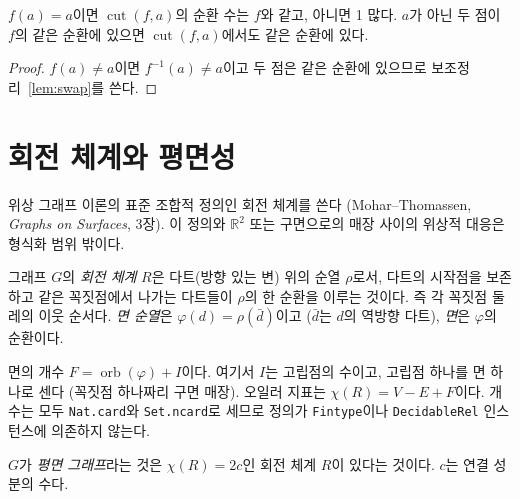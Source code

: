 \begin{lemma}[잘라 내기의 순환 수]
\label{lem:orbitCount_cut}
\leanok
{}
\(f(a) = a\)이면 \(\operatorname{cut}(f, a)\)의 순환 수는 \(f\)와 같고, 아니면 1 많다.
\(a\)가 아닌 두 점이 \(f\)의 같은 순환에 있으면 \(\operatorname{cut}(f, a)\)에서도 같은 순환에 있다.
\end{lemma}

\begin{proof}
\leanok
{}
\(f(a) \ne a\)이면 \(f^{-1}(a) \ne a\)이고 두 점은 같은 순환에 있으므로 보조정리~\ref{lem:swap}를 쓴다.
\end{proof}

\section{회전 체계와 평면성}

위상 그래프 이론의 표준 조합적 정의인 회전 체계를 쓴다
(Mohar--Thomassen, \emph{Graphs on Surfaces}, 3장).
이 정의와 \(\mathbb{R}^2\) 또는 구면으로의 매장 사이의 위상적 대응은 형식화 범위 밖이다.

\begin{definition}[회전 체계와 면]
\label{def:rotation}
\leanok
{}
그래프 \(G\)의 \emph{회전 체계} \(R\)은 다트(방향 있는 변) 위의 순열 \(\rho\)로서, 다트의 시작점을
보존하고 같은 꼭짓점에서 나가는 다트들이 \(\rho\)의 한 순환을 이루는 것이다. 즉 각 꼭짓점 둘레의
이웃 순서다. \emph{면 순열}은 \(\varphi(d) = \rho(\bar d)\)이고 (\(\bar d\)는 \(d\)의 역방향 다트),
\emph{면}은 \(\varphi\)의 순환이다.
\end{definition}

\begin{definition}[오일러 지표]
\label{def:eulerChar}
\leanok
{}
면의 개수 \(F = \operatorname{orb}(\varphi) + I\)이다. 여기서 \(I\)는 고립점의 수이고, 고립점 하나를
면 하나로 센다 (꼭짓점 하나짜리 구면 매장). 오일러 지표는 \(\chi(R) = V - E + F\)이다. 개수는 모두
\texttt{Nat.card}와 \texttt{Set.ncard}로 세므로 정의가 \texttt{Fintype}이나 \texttt{DecidableRel}
인스턴스에 의존하지 않는다.
\end{definition}

\begin{definition}[평면 그래프]
\label{def:IsPlanar}
\leanok
{}
\(G\)가 \emph{평면 그래프}라는 것은 \(\chi(R) = 2c\)인 회전 체계 \(R\)이 있다는 것이다. \(c\)는 연결
성분의 수다.
\end{definition}

